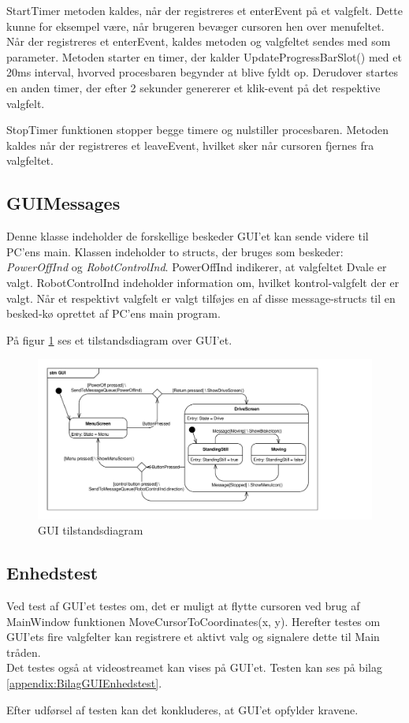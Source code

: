 StartTimer metoden kaldes, når der registreres et enterEvent på et valgfelt. 
Dette kunne for eksempel være, når brugeren bevæger cursoren hen over menufeltet.
Når der registreres et enterEvent, kaldes metoden og valgfeltet sendes med som parameter. 
Metoden starter en timer, der kalder UpdateProgressBarSlot() med et 20ms interval, hvorved procesbaren begynder at blive fyldt op. 
Derudover startes en anden timer, der efter 2 sekunder genererer et klik-event på det respektive valgfelt.

StopTimer funktionen stopper begge timere og nulstiller procesbaren. 
Metoden kaldes når der registreres et leaveEvent, hvilket sker når cursoren fjernes fra valgfeltet.

\subsection{GUIMessages}
Denne klasse indeholder de forskellige beskeder GUI'et kan sende videre til PC'ens main.
Klassen indeholder to structs, der bruges som beskeder: \textit{PowerOffInd} og \textit{RobotControlInd}. 
PowerOffInd indikerer, at valgfeltet Dvale er valgt. 
RobotControlInd indeholder information om, hvilket kontrol-valgfelt der er valgt. Når et respektivt valgfelt er valgt tilføjes en af disse message-structs til en besked-kø oprettet af PC'ens main program.

På figur \ref{GUI_STM} ses et tilstandsdiagram over GUI'et.

\begin{figure} [H]
	\centering
	\includegraphics[clip, trim = 0cm 0cm 3cm 0.5cm, width = \textwidth]{figur/STM_GUI.pdf}
	\caption{GUI tilstandsdiagram}
	\label{GUI_STM}
\end{figure}


\subsection{Enhedstest}
Ved test af GUI'et testes om, det er muligt at flytte cursoren ved brug af MainWindow funktionen MoveCursorToCoordinates(x, y). 
Herefter testes om GUI'ets fire valgfelter kan registrere et aktivt valg og signalere dette til Main tråden.\\
Det testes også at videostreamet kan vises på GUI'et. Testen kan ses på bilag \ref{appendix:BilagGUIEnhedstest}.

Efter udførsel af testen kan det konkluderes, at GUI'et opfylder kravene. 
	
%